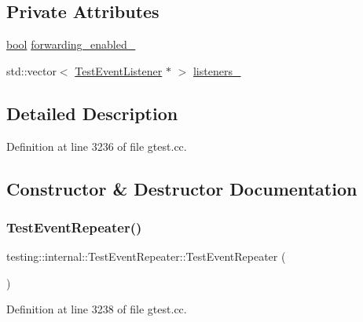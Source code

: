 \subsection*{Private Attributes}
\begin{DoxyCompactItemize}
\item 
\hyperlink{classbool}{bool} \hyperlink{classtesting_1_1internal_1_1TestEventRepeater_a1f7e494642d653eaad800504510d18a3}{forwarding\+\_\+enabled\+\_\+}
\item 
std\+::vector$<$ \hyperlink{classtesting_1_1TestEventListener}{Test\+Event\+Listener} $\ast$ $>$ \hyperlink{classtesting_1_1internal_1_1TestEventRepeater_a1c08e9302639108588d764b671c54825}{listeners\+\_\+}
\end{DoxyCompactItemize}


\subsection{Detailed Description}


Definition at line 3236 of file gtest.\+cc.



\subsection{Constructor \& Destructor Documentation}
\mbox{\label{classtesting_1_1internal_1_1TestEventRepeater_a97dc3b08bd62c615f16e4c73ed0b3894}} 
\subsubsection{\texorpdfstring{Test\+Event\+Repeater()}{TestEventRepeater()}}
{\footnotesize\ttfamily testing\+::internal\+::\+Test\+Event\+Repeater\+::\+Test\+Event\+Repeater (\begin{DoxyParamCaption}{ }\end{DoxyParamCaption})\hspace{0.3cm}{\ttfamily [inline]}}



Definition at line 3238 of file gtest.\+cc.



